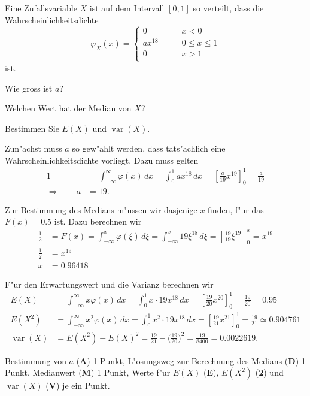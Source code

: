 Eine Zufallsvariable $X$ ist auf dem Intervall $[0,1]$ so verteilt, dass die
Wahrscheinlichkeitsdichte
\[
\varphi_X(x)=\begin{cases}
0&\qquad x < 0\\
ax^{18}&\qquad 0\le x \le 1\\
0&\qquad x > 1\\
\end{cases}
\]
ist.
\begin{teilaufgaben}
\item Wie gross ist $a$?
\item Welchen Wert hat der Median von $X$?
\item Bestimmen Sie $E(X)$ und $\operatorname{var}(X)$.
\end{teilaufgaben}

\begin{loesung}
\begin{teilaufgaben}
\item
Zun"achst muss $a$ so gew"ahlt werden, dass tats"achlich eine
Wahrscheinlichkeitsdichte vorliegt. Dazu muss gelten
\begin{align*}
1
&=
\int_{-\infty}^{\infty} \varphi(x)\,dx
=
\int_0^1 ax^{18}\,dx
=
\left[
\frac{a}{19}x^{19}
\right]_0^1
=\frac{a}{19}
\\
\Rightarrow \qquad a&= 19.
\end{align*}
\item
Zur Bestimmung des Medians m"ussen wir dasjenige $x$ finden, f"ur das 
$F(x)=0.5$ ist. Dazu berechnen wir
\begin{align*}
\frac12
&=
F(x)
=
\int_{-\infty}^x \varphi(\xi)\,d\xi
=
\int_{-\infty}^x 19\xi^{18}\,d\xi
=
\left[
\frac{19}{19}\xi^{19}
\right]_0^x
=x^{19}
\\
\frac12&=x^{19}\\
x&=0.96418
\end{align*}
\item
F"ur den Erwartungswert und die Varianz berechnen wir
\begin{align*}
E(X)
&=
\int_{-\infty}^\infty x\varphi(x)\,dx
=
\int_0^1x\cdot 19x^{18}\,dx
=
\left[
\frac{19}{20}x^{20}
\right]_0^1
=\frac{19}{20}=0.95
\\
E(X^2)
&=
\int_{-\infty}^\infty x^2\varphi(x)\,dx
=
\int_0^1x^2\cdot 19x^{18}\,dx
=
\left[
\frac{19}{21}x^{21}
\right]_0^1
=\frac{19}{21}
\simeq 0.904761
\\
\operatorname{var}(X)
&=
E(X^2)-E(X)^2
=
\frac{19}{21}-\biggl(\frac{19}{20}\biggr)^2
=
\frac{19}{8400}=0.0022619.
\end{align*}
\end{teilaufgaben}
\end{loesung}

\begin{bewertung}
Bestimmung von $a$ ({\bf A}) 1 Punkt,
L"osungsweg zur Berechnung des Medians ({\bf D}) 1 Punkt,
Medianwert ({\bf M}) 1 Punkt,
Werte f"ur $E(X)$ ({\bf E}),
$E(X^2)$  ({\bf 2}) und $\operatorname{var}(X)$ ({\bf V}) je ein Punkt.
\end{bewertung}

